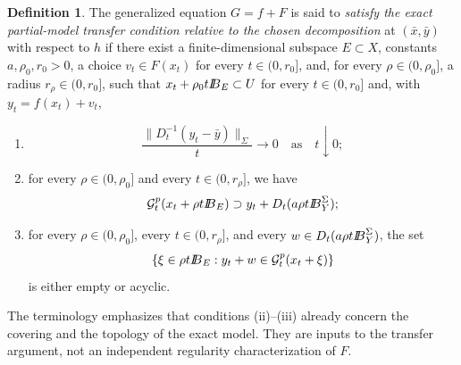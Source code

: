 \documentclass[11pt]{amsart}
\theoremstyle{definition}
\newtheorem{definition}[theorem]{Definition}
\theoremstyle{remark}
\newcommand{\bx}{\bar x}
\newcommand{\by}{\bar y}
\def\ball{{I\kern -.35em B}}
\begin{document}
	\begin{definition}
		\label{def:exact-partial-transfer}
		The generalized equation $G=f+F$ is said to \emph{satisfy the exact
			partial-model transfer condition relative to the chosen decomposition}
		at $(\bx,\by)$ with respect to $h$ if there exist a
		finite-dimensional subspace $E\subset X$, constants $a,\rho_0,r_0>0$,
		a choice $v_t\in F(x_t)$ for every $t\in(0,r_0]$, and, for every
		$\rho\in(0,\rho_0]$, a radius $r_\rho\in(0,r_0]$, such that
		$x_t+\rho_0t\ball_E\subset U$ for every $t\in(0,r_0]$ and, with
		$y_t=f(x_t)+v_t$,
		\begin{enumerate}[label={\rm (\roman*)}]
			\item
			\begin{equation*}
				\frac{\|D_t^{-1}(y_t-\by)\|_{\Sigma}}{t}\to0
				\quad\text{as}\quad t\downarrow0;
			\end{equation*}
			\item for every $\rho\in(0,\rho_0]$ and every $t\in(0,r_\rho]$, we have
			$$
			\mathcal G_t^p(x_t+\rho t\ball_E)
			\supset y_t+D_t(a\rho t\ball_Y^\Sigma);
			$$
			\item for every $\rho\in(0,\rho_0]$, every $t\in(0,r_\rho]$, and every
			$w\in D_t(a\rho t\ball_Y^{\Sigma})$, the set
			\begin{equation*}
				\{\xi\in\rho t\ball_E:
				y_t+w\in\mathcal G_t^p(x_t+\xi)\}
			\end{equation*}
			is either empty or acyclic.
		\end{enumerate}
	\end{definition}
	The terminology emphasizes that conditions {\rm (ii)}--{\rm (iii)} already
	concern the covering and the topology of the exact model. They are inputs to the
	transfer argument, not an independent regularity characterization of $F$.
	
\end{document}
